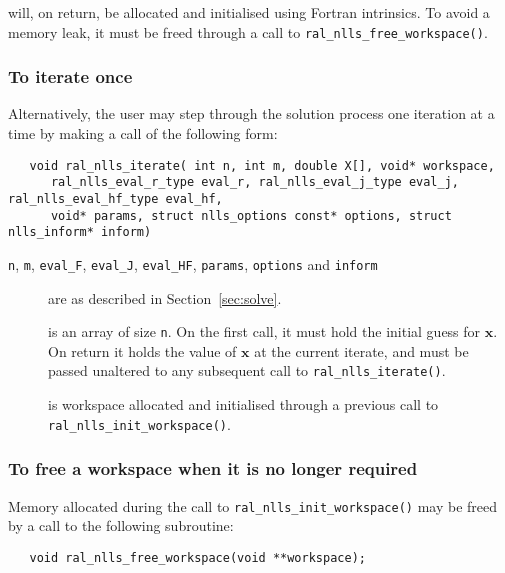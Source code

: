 \documentclass{spec}
\begin{document}
\begin{description}
    will, on return, be allocated and initialised using Fortran intrinsics.
      To avoid a memory leak, it must be freed through a call to \texttt{ral\_nlls\_free\_workspace()}.
\end{description}

\subsubsection{To iterate once}
\label{sec:iterate}
Alternatively, the user may step through the solution process one iteration at
a time by making a call of the following form:

\begin{verbatim}
   void ral_nlls_iterate( int n, int m, double X[], void* workspace,
      ral_nlls_eval_r_type eval_r, ral_nlls_eval_j_type eval_j, ral_nlls_eval_hf_type eval_hf,
      void* params, struct nlls_options const* options, struct nlls_inform* inform)
\end{verbatim}

\begin{description}

\item[\normalfont \texttt{n}, \texttt{m}, \texttt{eval\_F}, \texttt{eval\_J}, \texttt{eval\_HF}, \texttt{params}, \texttt{options} and \texttt{inform}] are as described in Section~\ref{sec:solve}.

 is an array of size {\tt n}. On the first call, it must hold the initial guess for
$\bm x$. On return it holds the value of $\bm x$ at the current iterate, and
must be passed unaltered to any subsequent call to \texttt{ral\_nlls\_iterate()}.

 is workspace allocated and initialised through a previous call to
\texttt{ral\_nlls\_init\_workspace()}.

\end{description}

\subsubsection{To free a workspace when it is no longer required}

Memory allocated during the call to \texttt{ral\_nlls\_init\_workspace()} may be freed
by a call to the following subroutine:
\begin{verbatim}
   void ral_nlls_free_workspace(void **workspace);
\end{verbatim}
\end{document}

